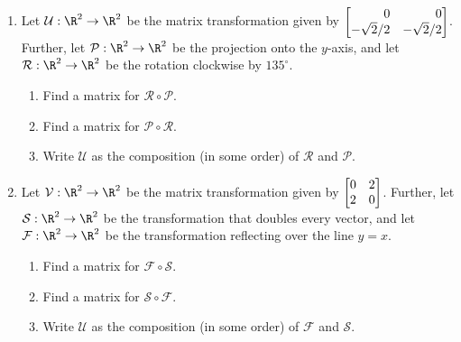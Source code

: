 \begin{exercises}
	\begin{problist}
		\prob 
		\begin{enumerate}
			\item Let $\mathcal U:\R^{2}\to\R^{2}$ be the matrix transformation
				given by $\mat{0&0\\-\sqrt{2}/2 & -\sqrt{2}/2}$.
				Further, let $\mathcal P:\R^{2}\to\R^{2}$ be the
				projection onto the $y$-axis, and let $\mathcal R:\R^{2}\to\R^{2}$
				be the rotation clockwise by $135^{\circ}$.
				\begin{enumerate}
					\item Find a matrix for $\mathcal R \circ \mathcal P$.

					\item Find a matrix for $\mathcal P \circ \mathcal R$.

					\item Write $\mathcal U$ as the composition
						(in some order) of $\mathcal R$ and
						$\mathcal P$.
				\end{enumerate}

			\item Let $\mathcal V:\R^{2}\to\R^{2}$ be the matrix transformation
				given by $\mat{0&2\\2&0}$.
				Further, let $\mathcal S:\R^{2}\to\R^{2}$ be the
				transformation that doubles every vector, and let
				$\mathcal F:\R^{2}\to\R^{2}$ be the
				transformation reflecting over the line $y=x$.
				\begin{enumerate}
					\item Find a matrix for $\mathcal F \circ \mathcal S$.

					\item Find a matrix for $\mathcal S \circ \mathcal F$.

					\item Write $\mathcal U$ as the composition
						(in some order) of $\mathcal F$ and
						$\mathcal S$.
				\end{enumerate}
		\end{enumerate}
		

\end{problist}
\end{exercises}
